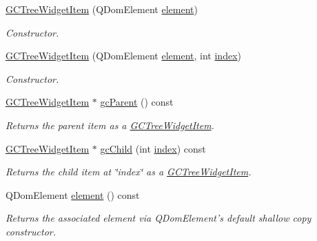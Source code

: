 \begin{DoxyCompactItemize}
\item 
\hyperlink{class_g_c_tree_widget_item_ab8ffe3b11f00edd90397b885bb58d4a4}{\-G\-C\-Tree\-Widget\-Item} (\-Q\-Dom\-Element \hyperlink{class_g_c_tree_widget_item_a584cad866bdbd94710d31eb77b804d84}{element})
\begin{DoxyCompactList}\small\item\em \-Constructor. \end{DoxyCompactList}\item 
\hyperlink{class_g_c_tree_widget_item_a82819ce07ee6d70fe41518c8a0382fcf}{\-G\-C\-Tree\-Widget\-Item} (\-Q\-Dom\-Element \hyperlink{class_g_c_tree_widget_item_a584cad866bdbd94710d31eb77b804d84}{element}, int \hyperlink{class_g_c_tree_widget_item_af6b48ae274cc4989811ef44944c8ad76}{index})
\begin{DoxyCompactList}\small\item\em \-Constructor. \end{DoxyCompactList}\item 
\hyperlink{class_g_c_tree_widget_item}{\-G\-C\-Tree\-Widget\-Item} $\ast$ \hyperlink{class_g_c_tree_widget_item_a1125dbc55a8ba3e50662b8258cb35fdf}{gc\-Parent} () const 
\begin{DoxyCompactList}\small\item\em \-Returns the parent item as a \hyperlink{class_g_c_tree_widget_item}{\-G\-C\-Tree\-Widget\-Item}. \end{DoxyCompactList}\item 
\hyperlink{class_g_c_tree_widget_item}{\-G\-C\-Tree\-Widget\-Item} $\ast$ \hyperlink{class_g_c_tree_widget_item_af44c0d2c5eaa1c5bb3a6a1aace3e8c78}{gc\-Child} (int \hyperlink{class_g_c_tree_widget_item_af6b48ae274cc4989811ef44944c8ad76}{index}) const 
\begin{DoxyCompactList}\small\item\em \-Returns the child item at \char`\"{}index\char`\"{} as a \hyperlink{class_g_c_tree_widget_item}{\-G\-C\-Tree\-Widget\-Item}. \end{DoxyCompactList}\item 
\-Q\-Dom\-Element \hyperlink{class_g_c_tree_widget_item_a584cad866bdbd94710d31eb77b804d84}{element} () const 
\begin{DoxyCompactList}\small\item\em \-Returns the associated element via \-Q\-Dom\-Element's default shallow copy constructor. \end{DoxyCompactList}\item 

\end{DoxyCompactItemize}
